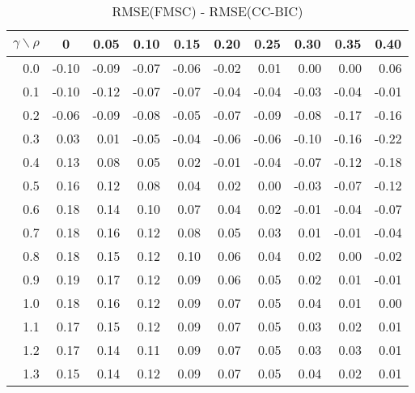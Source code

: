 \documentclass[12pt]{article}
\begin{document}
%
\begin{table}[!tbp]
\caption{RMSE(FMSC) - RMSE(CC-BIC)}
 \begin{center}
 \begin{tabular}{r|rrrrrrrrr}\hline\hline
\multicolumn{1}{c|}{$\gamma\backslash\rho$}&\multicolumn{1}{c}{0}&\multicolumn{1}{c}{0.05}&\multicolumn{1}{c}{0.10}&\multicolumn{1}{c}{0.15}&\multicolumn{1}{c}{0.20}&\multicolumn{1}{c}{0.25}&\multicolumn{1}{c}{0.30}&\multicolumn{1}{c}{0.35}&\multicolumn{1}{c}{0.40}\tabularnewline
\hline

0.0&-0.10&-0.09&-0.07&-0.06&-0.02& 0.01& 0.00& 0.00& 0.06\tabularnewline
0.1&-0.10&-0.12&-0.07&-0.07&-0.04&-0.04&-0.03&-0.04&-0.01\tabularnewline
0.2&-0.06&-0.09&-0.08&-0.05&-0.07&-0.09&-0.08&-0.17&-0.16\tabularnewline
0.3& 0.03& 0.01&-0.05&-0.04&-0.06&-0.06&-0.10&-0.16&-0.22\tabularnewline
0.4& 0.13& 0.08& 0.05& 0.02&-0.01&-0.04&-0.07&-0.12&-0.18\tabularnewline
0.5& 0.16& 0.12& 0.08& 0.04& 0.02& 0.00&-0.03&-0.07&-0.12\tabularnewline
0.6& 0.18& 0.14& 0.10& 0.07& 0.04& 0.02&-0.01&-0.04&-0.07\tabularnewline
0.7& 0.18& 0.16& 0.12& 0.08& 0.05& 0.03& 0.01&-0.01&-0.04\tabularnewline
0.8& 0.18& 0.15& 0.12& 0.10& 0.06& 0.04& 0.02& 0.00&-0.02\tabularnewline
0.9& 0.19& 0.17& 0.12& 0.09& 0.06& 0.05& 0.02& 0.01&-0.01\tabularnewline
1.0& 0.18& 0.16& 0.12& 0.09& 0.07& 0.05& 0.04& 0.01& 0.00\tabularnewline
1.1& 0.17& 0.15& 0.12& 0.09& 0.07& 0.05& 0.03& 0.02& 0.01\tabularnewline
1.2& 0.17& 0.14& 0.11& 0.09& 0.07& 0.05& 0.03& 0.03& 0.01\tabularnewline
1.3& 0.15& 0.14& 0.12& 0.09& 0.07& 0.05& 0.04& 0.02& 0.01\tabularnewline
\hline
\end{tabular}

\end{center}

\end{table}
\end{document}
